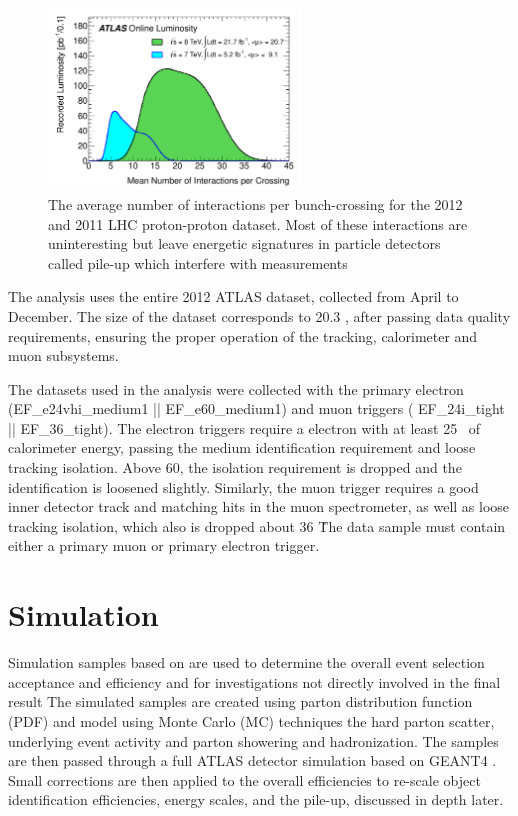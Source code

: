 \begin{figure}[!t]
\centering 
\includegraphics[width=0.60\textwidth]{figs/mu_2011_2012-dec.pdf}
\caption{ The average number of interactions per bunch-crossing for the 2012 and 2011 LHC proton-proton dataset. Most of these interactions are uninteresting but leave energetic signatures in particle detectors called pile-up which interfere with measurements}\label{figure:data_pileup}
\end{figure} 

The \tth analysis uses the entire 2012 ATLAS dataset, collected
from April to December. The size of the dataset corresponds to 20.3 \ifb, after passing data quality
requirements, ensuring the proper operation of the tracking, calorimeter and muon subsystems.  

The datasets used in the analysis were collected with the primary electron
(EF\_e24vhi\_medium1 || EF\_e60\_medium1) and muon triggers (
    EF\_24i\_tight || EF\_36\_tight). The electron triggers require a electron
with at least 25 \gev\ of calorimeter energy, passing the medium identification
requirement and loose tracking isolation.  Above 60\gev, the isolation
requirement is dropped and the identification is loosened slightly. Similarly,
            the muon trigger requires a good inner detector track and matching
            hits in the muon spectrometer, as well as loose tracking isolation,
            which also is dropped about 36 \gev\.  The data sample must contain
            either a primary muon or primary electron trigger. 

\section{Simulation}

Simulation samples based on are used to determine the 
overall event selection acceptance and efficiency and for investigations not directly involved
in the final result The simulated samples are created using parton distribution function (PDF) and
model using Monte Carlo (MC) techniques the hard parton scatter, underlying event activity and parton showering and hadronization. 
The samples are then passed through a full ATLAS detector simulation\cite{Aad:2010ah} based on  GEANT4 \cite{Agostinelli:2002hh}.
Small corrections are then applied to the overall efficiencies to re-scale object identification efficiencies,
      energy scales, and the pile-up, discussed in depth later.  

